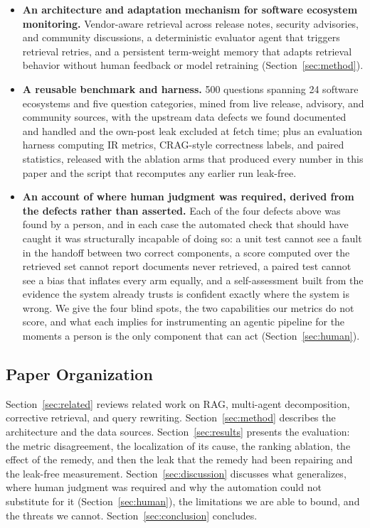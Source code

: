 \documentclass[acmsmall,review,anonymous,screen]{acmart}
\begin{document}
\begin{itemize}
  \item \textbf{An architecture and adaptation mechanism for software ecosystem
  monitoring.} Vendor-aware retrieval across release notes, security advisories,
  and community discussions, a deterministic evaluator agent that triggers
  retrieval retries, and a persistent term-weight memory that adapts retrieval
  behavior without human feedback or model retraining (Section~\ref{sec:method}).

  \item \textbf{A reusable benchmark and harness.} 500 questions spanning 24
  software ecosystems and five question categories, mined from live release,
  advisory, and community sources, with the upstream data defects we found
  documented and handled and the own-post leak excluded at fetch time; plus an
  evaluation harness computing IR metrics, CRAG-style correctness labels, and
  paired statistics, released with the ablation arms that produced every number
  in this paper and the script that recomputes any earlier run leak-free.

  \item \textbf{An account of where human judgment was required, derived from
  the defects rather than asserted.} Each of the four defects above was found by
  a person, and in each case the automated check that should have caught it was
  structurally incapable of doing so: a unit test cannot see a fault in the
  handoff between two correct components, a score computed over the retrieved
  set cannot report documents never retrieved, a paired test cannot see a bias
  that inflates every arm equally, and a self-assessment built from the evidence
  the system already trusts is confident exactly where the system is wrong. We
  give the four blind spots, the two capabilities our metrics do not score, and
  what each implies for instrumenting an agentic pipeline for the moments a
  person is the only component that can act (Section~\ref{sec:human}).
\end{itemize}

\subsection{Paper Organization}

Section~\ref{sec:related} reviews related work on RAG, multi-agent
decomposition, corrective retrieval, and query rewriting.
Section~\ref{sec:method} describes the architecture and the data sources.
Section~\ref{sec:results} presents the evaluation: the metric disagreement, the
localization of its cause, the ranking ablation, the effect of the remedy, and
then the leak that the remedy had been repairing and the leak-free measurement.
Section~\ref{sec:discussion} discusses what generalizes, where human judgment
was required and why the automation could not substitute for it
(Section~\ref{sec:human}), the limitations we are able to bound, and the threats
we cannot.
Section~\ref{sec:conclusion} concludes.
\end{document}
